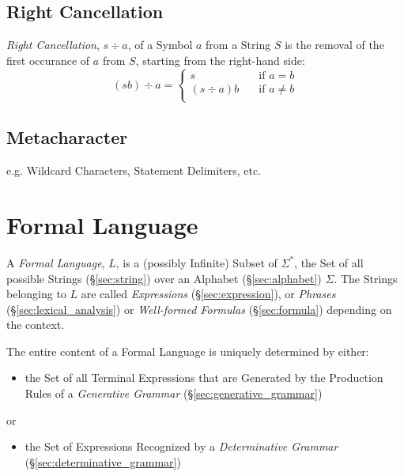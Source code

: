 \subsection{Right Cancellation}\label{sec:right_cancellation}

\emph{Right Cancellation}, $s \div a$, of a Symbol $a$ from a String $S$ is the
removal of the first occurance of $a$ from $S$, starting from the right-hand
side:
\[
  (sb) \div a =
  \begin{cases}
    s           & \quad \text{if $a = b$}\\
    (s \div a)b & \quad \text{if $a \neq b$}\\
  \end{cases}
\]



\subsection{Metacharacter}\label{sec:metacharacter}


e.g. Wildcard Characters, Statement Delimiters, etc.



\section{Formal Language}\label{sec:formal_language}

A \emph{Formal Language}, $L$, is a (possibly Infinite) Subset of $\Sigma^*$,
the Set of all possible Strings (\S\ref{sec:string}) over an Alphabet
(\S\ref{sec:alphabet}) $\Sigma$. The Strings belonging to $L$ are called
\emph{Expressions} (\S\ref{sec:expression}), or \emph{Phrases}
(\S\ref{sec:lexical_analysis}) or \emph{Well-formed Formulas}
(\S\ref{sec:formula}) depending on the context.

The entire content of a Formal Language is uniquely determined by either:
\begin{itemize}
  \item the Set of all Terminal Expressions that are Generated by the Production
    Rules of a \emph{Generative Grammar} (\S\ref{sec:generative_grammar})
\end{itemize}
or
\begin{itemize}
  \item the Set of Expressions Recognized by a \emph{Determinative Grammar}
    (\S\ref{sec:determinative_grammar})
\end{itemize}

